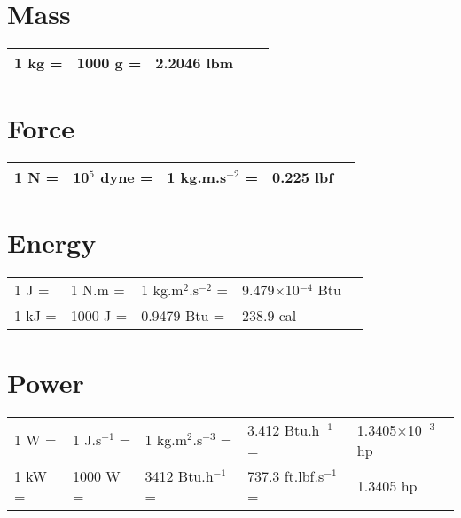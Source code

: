 \documentclass[11pts,a4paper,amsmath,amssymb,floatfix]{article}
\begin{document}
\section{Mass}\label{Chapter:UnitConversion:Section:Mass}
     \begin{center}
     \begin{tabular}{|l l l l l|}
       \hline    
        1 kg =& 1000 g =& 2.2046 lbm & & \\
       \hline            
     \end{tabular}
     \end{center}


          
\section{Force}\label{Chapter:UnitConversion:Section:Force}
     \begin{center}
     \begin{tabular}{|l l l l l|}
       \hline    
         1 N =& 10$^{5}$ dyne =& 1 kg.m.s$^{-2}$ =& 0.225 lbf & \\
       \hline            
     \end{tabular}
     \end{center}

     
\section{Energy}\label{Chapter:UnitConversion:Section:Energy}
     \begin{center}
     \begin{tabular}{|l l l l l|}
       \hline
       1 J =& 1 N.m  =& 1 kg.m$^{2}$.s$^{-2}$ =& 9.479$\times$10$^{-4}$ Btu &  \\
       1 kJ =&  1000 J  =&  0.9479 Btu  =& 238.9 cal &                      \\
       \hline           
     \end{tabular}
     \end{center}
     
\section{Power}\label{Chapter:UnitConversion:Section:Power}
     \begin{center}
     \begin{tabular}{|l l l l l|}
       \hline
       1 W =& 1 J.s$^{-1}$  =& 1 kg.m$^{2}$.s$^{-3}$ =& 3.412 Btu.h$^{-1}$ =& 1.3405$\times$10$^{-3}$ hp   \\
       1 kW =&  1000 W  =& 3412 Btu.h$^{-1}$  =& 737.3 ft.lbf.s$^{-1}$ =& 1.3405 hp  \\
       \hline           
     \end{tabular}
     \end{center}
     
\end{document}
